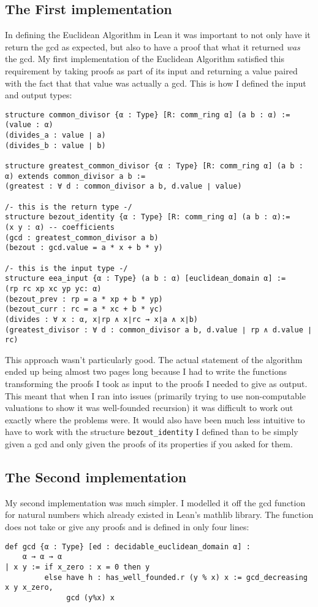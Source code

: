 \documentclass{article}
\newcommand{\ct}{\texttt}
\begin{document}
\subsection{The First implementation}
In defining the Euclidean Algorithm in Lean it was important to not only have it return the gcd as expected, but also to have a proof that what it returned \textit{was} the gcd. 
My first implementation of the Euclidean Algorithm satisfied this requirement by taking proofs as part of its input and returning a value paired with the fact that that value was actually a gcd. 
This is how I defined the input and output types:
\begin{lstlisting}
structure common_divisor {α : Type} [R: comm_ring α] (a b : α) :=
(value : α)
(divides_a : value ∣ a) 
(divides_b : value ∣ b)

structure greatest_common_divisor {α : Type} [R: comm_ring α] (a b : α) extends common_divisor a b :=
(greatest : ∀ d : common_divisor a b, d.value ∣ value)

/- this is the return type -/
structure bezout_identity {α : Type} [R: comm_ring α] (a b : α):= 
(x y : α) -- coefficients
(gcd : greatest_common_divisor a b)
(bezout : gcd.value = a * x + b * y)

/- this is the input type -/
structure eea_input {α : Type} (a b : α) [euclidean_domain α] := 
(rp rc xp xc yp yc: α)
(bezout_prev : rp = a * xp + b * yp)
(bezout_curr : rc = a * xc + b * yc)
(divides : ∀ x : α, x∣rp ∧ x∣rc → x∣a ∧ x∣b)
(greatest_divisor : ∀ d : common_divisor a b, d.value ∣ rp ∧ d.value ∣ rc)
\end{lstlisting}

This approach wasn't particularly good. The actual statement of the algorithm ended up being almost two pages long because I had to write the functions transforming the proofs I took as input to the proofs I needed to give as output. This meant that when I ran into issues (primarily trying to use non-computable valuations to show it was well-founded recursion) it was difficult to work out exactly where the problems were. It would also have been much less intuitive to have to work with the structure \ct{bezout\_identity} I defined than to be simply given a gcd and only given the proofs of its properties if you asked for them.

\subsection{The Second implementation}
My second implementation was much simpler. I modelled it off the gcd function for natural numbers which already existed in Lean's mathlib library. The function does not take or give any proofs and is defined in only four lines:
\begin{lstlisting}
def gcd {α : Type} [ed : decidable_euclidean_domain α] : 
    α → α → α
| x y := if x_zero : x = 0 then y
         else have h : has_well_founded.r (y % x) x := gcd_decreasing x y x_zero,
              gcd (y%x) x
\end{lstlisting}
\end{document}

